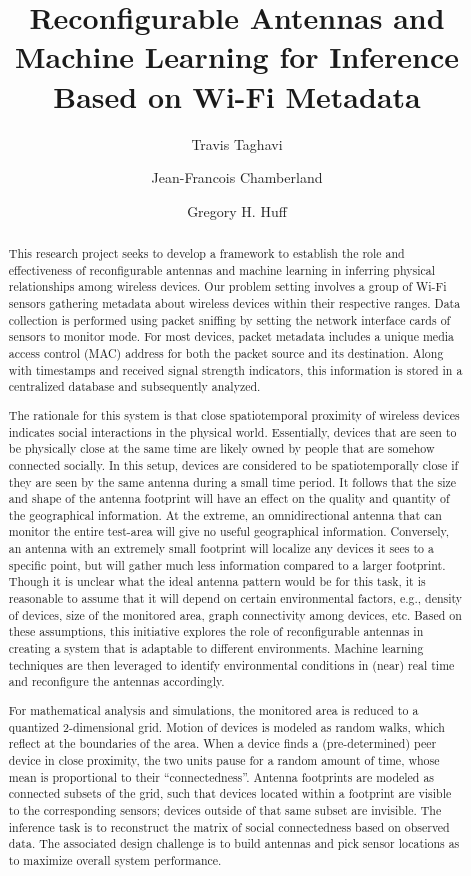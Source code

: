 \documentclass{ursiNRSM}
\title{Reconfigurable Antennas and Machine Learning for Inference Based on Wi-Fi Metadata}
\author[org1]{Travis Taghavi}
\author[org1]{Jean-Francois Chamberland}
\author[org1]{Gregory H. Huff}
\begin{document}
\begin{abstract}

This research project seeks to develop a framework to establish the role and effectiveness of reconfigurable antennas and machine learning in inferring physical relationships among wireless devices.
Our problem setting involves a group of Wi-Fi sensors gathering metadata about wireless devices within their respective ranges.
Data collection is performed using packet sniffing by setting the network interface cards of sensors to monitor mode.
For most devices, packet metadata includes a unique media access control (MAC) address for both the packet source and its destination.
Along with timestamps and received signal strength indicators, this information is stored in a centralized database and subsequently analyzed.

The rationale for this system is that close spatiotemporal proximity of wireless devices indicates social interactions in the physical world.
Essentially, devices that are seen to be physically close at the same time are likely owned by people that are somehow connected socially.
In this setup, devices are considered to be spatiotemporally close if they are seen by the same antenna during a small time period.
It follows that the size and shape of the antenna footprint will have an effect on the quality and quantity of the geographical information.
At the extreme, an omnidirectional antenna that can monitor the entire test-area will give no useful geographical information.
Conversely, an antenna with an extremely small footprint will localize any devices it sees to a specific point, but will gather much less information compared to a larger footprint.
Though it is unclear what the ideal antenna pattern would be for this task, it is reasonable to assume that it will depend on certain environmental factors, e.g., density of devices, size of the monitored area, graph connectivity among devices, etc.
Based on these assumptions, this initiative explores the role of reconfigurable antennas in creating a system that is adaptable to different environments.
Machine learning techniques are then leveraged to identify environmental conditions in (near) real time and reconfigure the antennas accordingly.

For mathematical analysis and simulations, the monitored area is reduced to a quantized 2-dimensional grid.
Motion of devices is modeled as random walks, which reflect at the boundaries of the area.
When a device finds a (pre-determined) peer device in close proximity, the two units pause for a random amount of time, whose mean is proportional to their ``connectedness''.
Antenna footprints are modeled as connected subsets of the grid, such that devices located within a footprint are visible to the corresponding sensors; devices outside of that same subset are invisible.
The inference task is to reconstruct the matrix of social connectedness based on observed data.
The associated design challenge is to build antennas and pick sensor locations as to maximize overall system performance.

\end{abstract}
\end{document}

